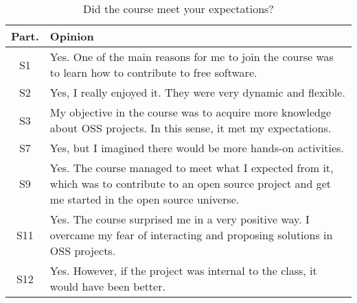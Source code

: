 \begin{table}[htb]
    \caption{Did the course meet your expectations?}
    \label{tab:expectations}
    \begin{tabular}{c|p{7cm}}
    \hline
    Part. & Opinion \\ 
    \hline
       S1  &  Yes. One of the main reasons for me to join the course was to learn how to contribute to free software. 
       \\
       S2 & Yes, I really enjoyed it. They were very dynamic and flexible.
       \\
       S3 & My objective in the course was to acquire more knowledge about OSS projects. In this sense, it met my expectations.
       \\
       S7 & Yes, but I imagined there would be more hands-on activities. \\
       S9 & Yes. The course managed to meet what I expected from it, which was to contribute to an open source project and get me started in the open source universe.
       \\
       S11 & Yes. The course surprised me in a very positive way. I overcame my fear of interacting and proposing solutions in OSS projects.
       \\
       S12  & Yes. However, if the project was internal to the class, it would have been better.\\
       \hline
    \end{tabular}
\end{table}